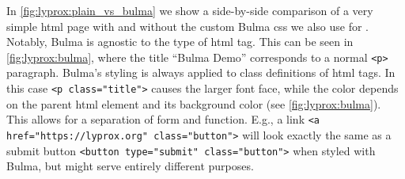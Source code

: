 \documentclass[\relativeRoot/main.tex]{subfiles}
\begin{document}
In \cref{fig:lyprox:plain_vs_bulma} we show a side-by-side comparison of a very simple \acrshort{html} page with and without the custom Bulma \acrshort{css} we also use for \inlinelyproxlogo{}. Notably, Bulma is agnostic to the type of \acrshort{html} tag. This can be seen in \cref{fig:lyprox:bulma}, where the title ``Bulma Demo'' corresponds to a normal \texttt{<p>} paragraph. Bulma's styling is always applied to class definitions of \acrshort{html} tags. In this case \texttt{<p class="title">} causes the larger font face, while the color depends on the parent \acrshort{html} element and its background color (see \cref{fig:lyprox:bulma}). This allows for a separation of form and function. E.g., a link \texttt{<a href="https://lyprox.org" class="button">} will look exactly the same as a submit button \texttt{<button type="submit" class="button">} when styled with Bulma, but might serve entirely different purposes.
\end{document}
